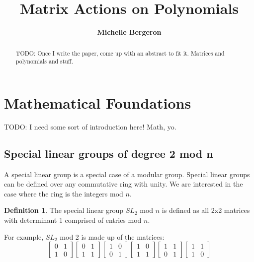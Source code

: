 \documentclass[a4paper,draft]{amsproc}
\title[Matrix Actions]{Matrix Actions on Polynomials}
\author[Bergeron]{\bfseries Michelle Bergeron}
\theoremstyle{plain}
\theoremstyle{definition}
\newtheorem{dfn}{Definition}[section]
\theoremstyle{remark}
\numberwithin{equation}{section}
\begin{document}
\vspace{18mm} \setcounter{page}{1} \thispagestyle{empty}


\begin{abstract}
TODO: Once I write the paper, come up with an abstract to fit it. Matrices and polynomials and stuff. 
\end{abstract}

\maketitle

\section{Mathematical Foundations} 

TODO: I need some sort of introduction here! Math, yo. 

\subsection{Special linear groups of degree 2 mod n}
A special linear group is a special case of a modular group. Special linear groups can be defined over any commutative ring with unity. We are interested in the case where the ring is the integers mod $n$. 
\begin{dfn}
The special linear group $SL_{2}$ mod $n$ is defined as all 2x2 matrices with determinant 1 comprised of entries mod $n$.
\end{dfn}

For example, $SL_{2}$ mod 2 is made up of the matrices:
$$
\begin{bmatrix}
 0&1 \\ 
 1&0 
\end{bmatrix}
\begin{bmatrix}
 0&1 \\ 
 1&1 
\end{bmatrix}
\begin{bmatrix}
 1&0 \\ 
 0&1 
\end{bmatrix}
\begin{bmatrix}
 1&0 \\ 
 1&1 
\end{bmatrix}
\begin{bmatrix}
 1&1 \\ 
 0&1 
\end{bmatrix}
\begin{bmatrix}
 1&1 \\ 
 1&0 
\end{bmatrix}
$$
\end{document}
